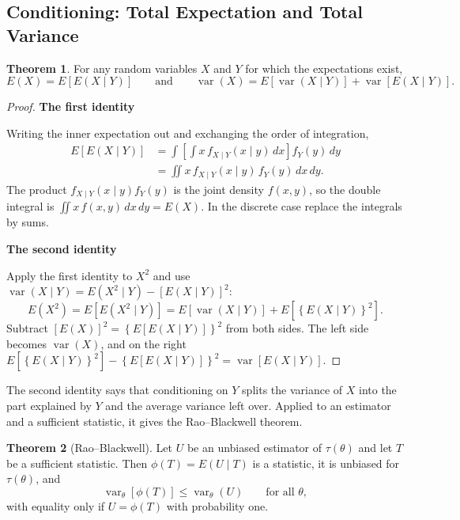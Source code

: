 \documentclass[12pt,a4paper]{report}
\theoremstyle{definition}
\newtheorem{thm}{Theorem}[section]
\newcommand{\subhead}[1]{%
  \par\medskip\noindent\textbf{#1}\par\nobreak\smallskip}
\DeclareMathOperator{\var}{var}
\begin{document}
\subsection{Conditioning: Total Expectation and Total Variance}

\begin{thm}
\label{thm:totalexpectation}
For any random variables $X$ and $Y$ for which the expectations exist,
\[E(X) = E\left[E(X\mid Y)\right]\qquad\text{and}\qquad
\var(X) = E\left[\var(X\mid Y)\right] + \var\left[E(X\mid Y)\right].\]
\end{thm}

\begin{proof}
\subhead{The first identity}
Writing the inner expectation out and exchanging the order of integration,
\begin{align*}
E\left[E(X\mid Y)\right] &= \int \left[\int x\, f_{X\mid Y}(x\mid y)\,dx\right] f_Y(y)\,dy\\
&= \iint x\, f_{X\mid Y}(x\mid y)\, f_Y(y)\,dx\,dy .
\end{align*}
The product $f_{X\mid Y}(x\mid y)f_Y(y)$ is the joint density $f(x,y)$, so the
double integral is $\iint x\,f(x,y)\,dx\,dy = E(X)$. In the discrete case
replace the integrals by sums.

\subhead{The second identity}
Apply the first identity to $X^2$ and use
$\var(X\mid Y) = E\left(X^2\mid Y\right) - \left[E(X\mid Y)\right]^2$:
\[E\left(X^2\right) = E\left[E\left(X^2\mid Y\right)\right]
= E\left[\var(X\mid Y)\right] + E\left[\left\{E(X\mid Y)\right\}^2\right].\]
Subtract $\left[E(X)\right]^2 = \left\{E\left[E(X\mid Y)\right]\right\}^2$ from both
sides. The left side becomes $\var(X)$, and on the right
$E\left[\left\{E(X\mid Y)\right\}^2\right] - \left\{E\left[E(X\mid Y)\right]\right\}^2
= \var\left[E(X\mid Y)\right]$.
\end{proof}

The second identity says that conditioning on $Y$ splits the variance of $X$ into
the part explained by $Y$ and the average variance left over. Applied to an
estimator and a sufficient statistic, it gives the Rao--Blackwell theorem.

\begin{thm}[Rao--Blackwell]
\label{thm:raoblackwell}
Let $U$ be an unbiased estimator of $\tau(\theta)$ and let $T$ be a sufficient
statistic. Then $\phi(T) = E(U\mid T)$ is a statistic, it is unbiased for
$\tau(\theta)$, and
\[\var_\theta\left[\phi(T)\right]\le\var_\theta(U)\qquad\text{for all } \theta ,\]
with equality only if $U = \phi(T)$ with probability one.
\end{thm}
\end{document}
